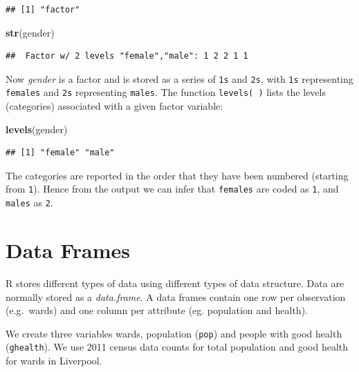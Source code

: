 \documentclass[]{book}
\newenvironment{Shaded}{\begin{snugshade}}{\end{snugshade}}
\newcommand{\KeywordTok}[1]{\textcolor[rgb]{0.13,0.29,0.53}{\textbf{#1}}}
\newcommand{\NormalTok}[1]{#1}
\begin{document}
\begin{verbatim}
## [1] "factor"
\end{verbatim}

\begin{Shaded}
\begin{Highlighting}[]
\KeywordTok{str}\NormalTok{(gender)}
\end{Highlighting}
\end{Shaded}

\begin{verbatim}
##  Factor w/ 2 levels "female","male": 1 2 2 1 1
\end{verbatim}

Now \emph{gender} is a factor and is stored as a series of \texttt{1s}
and \texttt{2s}, with \texttt{1s} representing \texttt{females} and
\texttt{2s} representing \texttt{males}. The function
\texttt{levels(\ )} lists the levels (categories) associated with a
given factor variable:

\begin{Shaded}
\begin{Highlighting}[]
\KeywordTok{levels}\NormalTok{(gender)}
\end{Highlighting}
\end{Shaded}

\begin{verbatim}
## [1] "female" "male"
\end{verbatim}

The categories are reported in the order that they have been numbered
(starting from \texttt{1}). Hence from the output we can infer that
\texttt{females} are coded as \texttt{1}, and \texttt{males} as
\texttt{2}.

\section{Data Frames}\label{data-frames}

R stores different types of data using different types of data
structure. Data are normally stored as a \emph{data.frame}. A data
frames contain one row per observation (e.g.~wards) and one column per
attribute (eg. population and health).

We create three variables wards, population (\texttt{pop}) and people
with good health (\texttt{ghealth}). We use 2011 census data counts for
total population and good health for wards in Liverpool.
\end{document}

